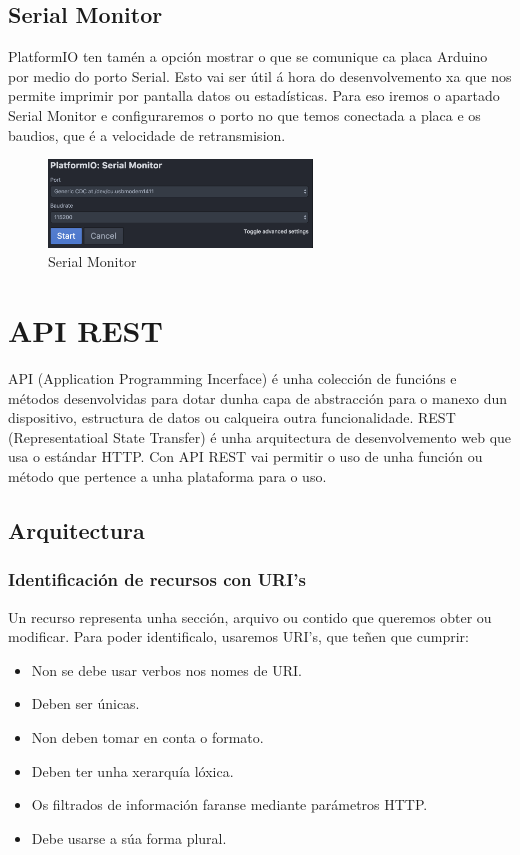 \documentclass[11pt,twoside]{book}
\begin{document}
\subsection{Serial Monitor}

PlatformIO ten tamén a opción mostrar o que se comunique ca placa Arduino por medio do porto Serial.
Esto vai ser útil á hora do desenvolvemento xa que nos permite imprimir por pantalla datos ou estadísticas.
 Para eso iremos o apartado Serial Monitor e configuraremos o porto no que temos conectada a placa e os baudios, que é a velocidade de retransmision.
 
 \begin{figure}[H]
	\begin{center}
		\includegraphics[width=7cm]{images/serial_monitor.png}
	\end{center}
	\caption{Serial Monitor}
	\label{fig:LibreriasAtom}
\end{figure}

\section{API REST}

API (Application Programming Incerface) é unha colección de funcións e métodos desenvolvidas para dotar dunha capa de abstracción para o manexo dun dispositivo, estructura de datos ou calqueira outra funcionalidade. 
REST (Representatioal State Transfer) é unha arquitectura de desenvolvemento web que usa o estándar HTTP. 
Con API REST vai permitir o uso de unha función ou método que pertence a unha plataforma para o uso.

\subsection{Arquitectura}

\subsubsection{Identificación de recursos con URI's}

Un recurso representa unha sección, arquivo ou contido que queremos obter ou modificar. Para poder identificalo, usaremos URI's, que teñen que cumprir:
\begin{itemize}
    \item Non se debe usar verbos nos nomes de URI.
    \item Deben ser únicas.
    \item Non deben tomar en conta o formato.
    \item Deben ter unha xerarquía lóxica.
    \item Os filtrados de información faranse mediante parámetros HTTP.
    \item Debe usarse a súa forma plural.
\end{itemize}
\end{document}
